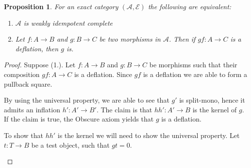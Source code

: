 \documentclass[11pt]{article}
\newtheorem{prop}[theorem]{Proposition}
\theoremstyle{definition}
\theoremstyle{remark}
\begin{document}
            \begin{prop}
                For an exact category $(\mathcal{A},\mathcal{E})$ the following are equivalent:
                \begin{enumerate}
                    \item $\mathcal{A}$ is weakly idempotent complete
                    \item Let $f: A\rightarrow B$ and $g: B\rightarrow C$ be two morphisms in $\mathcal{A}$. Then if $gf:A\rightarrow C$ is a deflation, then $g$ is.
                \end{enumerate}
            \end{prop}

            \begin{proof}
                Suppose (1.). Let $f:A\rightarrow B$ and $g:B\rightarrow C$ be morphisms such that their composition $gf:A\rightarrow C$ is a deflation. Since $gf$ is a deflation we are able to form a pullback square.

                \begin{center}
                \end{center}

                By using the universal property, we are able to see that $g'$ is split-mono, hence it admits an inflation $h':A'\rightarrow B'$. The claim is that $hh':A'\rightarrow B$ is the kernel of $g$. If the claim is true, the Obscure axiom yields that $g$ is a deflation.

                To show that $hh'$ is the kernel we will need to show the universal property. Let $t:T\rightarrow B$ be a test object, such that $gt=0$.

                \begin{center}
                \end{center}


\end{proof}
\end{document}
